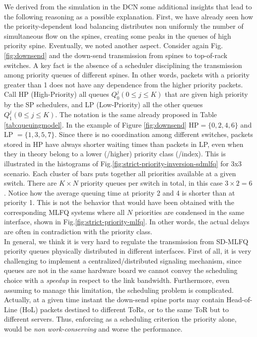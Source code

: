 We derived from the simulation in the DCN some additional insights that lead to the following reasoning as a possible explanation. First, we have already seen how the priority-dependent load balancing distributes non uniformly the number of simultaneous flow on the spines, creating some peaks in the queues of high priority spine. Eventually, we noted another aspect. Consider again Fig.\ref{fig:downsend} and the down-send transmission from spines to top-of-rack switches. A key fact is the absence of a scheduler disciplining the transmission among priority queues of different spines. In other words, packets with a priority greater than 1 does not have any dependence from the higher priority packets. Call HP (High-Priority) all queues $Q_0^j(0 \leq j \le K)$ that are given high priority by the SP schedulers, and LP (Low-Priority) all the other queues $Q_1^j(0 \leq j \le K)$. The notation is the same already proposed in Table \ref{tab:queuingmodel}. In the example of Figure \ref{fig:downsend} HP$ = \{0,2,4,6\}$ and LP $ = \{1,3,5,7\}$. %
Since there is no coordination among different switches, packets stored in HP have always shorter waiting times than packets in LP, even when they in theory belong to a lower (/higher) priority class (/index). This is illustrated in the histograms of Fig.\ref{fig:strict-priority-inversion-sdmlfq} for 3x3 scenario. Each cluster of bars puts together all priorities available at a given switch. There are $K \times N$ priority queues per switch in total, in this case $3 \times 2 = 6$. Notice how the average queuing time at priority 2 and 4 is shorter than at priority 1. This is not the behavior that would have been obtained with the corresponding MLFQ systems where all $N$ priorities are condensed in the same interface, shown in Fig.\ref{fig:strict-priority-mlfq}. In other words, the actual delays are often in contradiction with the priority class. \\
In general, we think it is very hard to regulate the transmission from SD-MLFQ priority queues physically distributed in different interfaces. First of all, it is very challenging to implement a centralized/distributed signaling mechanism, since queues are not in the same hardware board we cannot convey the scheduling choice with a \emph{speedup} in respect to the link bandwidth. Furthermore, even assuming to manage this limitation, the scheduling problem is complicated. Actually, at a given time instant the down-send spine ports may contain Head-of-Line (HoL) packets destined to different ToRs, or to the same ToR but to different servers. Thus, enforcing as a scheduling criterion the priority alone, would be \emph{non work-conserving} and worse the performance. 
